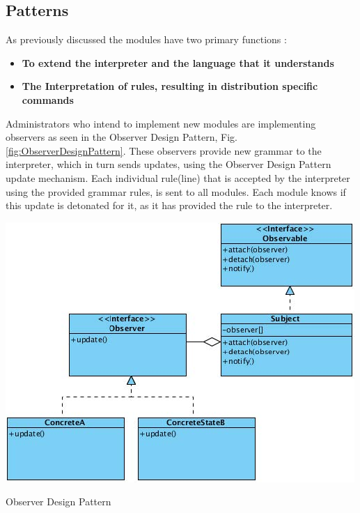 	\subsection{Patterns}
	
		\normalsize
		{
			As previously discussed the modules have two primary functions :  
			
			\begin{itemize}[itemsep=1pt,parsep=1pt]
				\item \textbf{To extend the interpreter and the language that it understands }
				\item \textbf{The Interpretation of rules, resulting in distribution specific commands}
			\end{itemize}				
		}
			
			\vspace{-3mm}
			\begin{multicols}{2}
			
				Administrators who intend to implement new modules are implementing observers as seen in the Observer Design Pattern, Fig. \ref{fig:ObserverDesignPattern}.
				\newline
				\newline
				These observers provide new grammar to the interpreter, which in turn sends updates, using the Observer Design Pattern update mechanism. 
				Each individual rule(line) that is accepted by the interpreter using the provided grammar rules, is sent to all modules.	
				Each module knows if this update is detonated for it, as it has provided the rule to the interpreter.
			
				\columnbreak
				
				\begin{figurehere}
					\centering
					\includegraphics[scale=0.55]{pages/chapter3/figures/observer.jpg}
					\caption{Observer Design Pattern}
					\label{fig:ObserverDesignPattern}
				\end{figurehere}
			
			\end{multicols}
			
